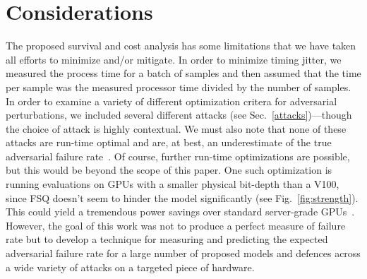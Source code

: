 \section{Considerations}
The proposed survival and cost analysis  has some limitations that we have taken all efforts to minimize and/or mitigate. In order to minimize timing jitter, we measured the process time for a batch of samples and then assumed that the time per sample was the measured processor time divided by the number of samples. In order to examine a variety of different optimization critera for adversarial perturbations, we included several different attacks (see Sec.~\ref{attacks})---though the choice of attack is highly contextual. We must also note that none of these attacks are run-time optimal and are, at best, an underestimate of the true adversarial failure rate~\citep{meyers}. Of course, further run-time optimizations are possible, but this would be beyond the scope of this paper. 
One such optimization is running evaluations on GPUs with a smaller physical bit-depth than a V100, since FSQ doesn't seem to hinder the model significantly (see Fig.~\ref{fig:strength}). This could yield a tremendous power savings over standard server-grade GPUs~\citep{chou2023applicability}.
However, the goal of this work was not to produce a perfect measure of failure rate but to develop a technique for measuring and predicting the expected adversarial failure rate for a large number of proposed models and defences across a wide variety of attacks on a targeted piece of hardware.

